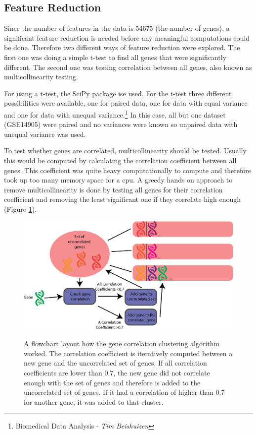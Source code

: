 \documentclass[10pt,a4paper]{article}
\begin{document}
	\subsection{Feature Reduction}
	\label{subsec:MethodsFeatureReduction}
	
	Since the number of features in the data is 54675 (the number of genes), a significant feature reduction is needed before any meaningful computations could be done. Therefore two different ways of feature reduction were explored. The first one was doing a simple t-test to find all genes that were significantly different. The second one was testing correlation between all genes, also known as multicollinearity testing.
	
	For using a t-test, the SciPy package ise used. For the t-test three different possibilities were available, one for paired data, one for data with equal variance and one for data with unequal variance.\footnote{\label{fn:BDA}Biomedical Data Analysis - \textit{Tim Beishuizen}} In this case, all but one dataset (GSE14905) were paired and no variances were known so unpaired data with unequal variance was used.
	
	To test whether genes are correlated, multicollinearity should be tested. Usually this would be computed by calculating the correlation coefficient between all genes. This coefficient was quite heavy computationally to compute and therefore took up too many memory space for a cpu. A greedy hands on approach to remove multicollinearity is done by testing all genes for their correlation coefficient and removing the least significant one if they correlate high enough (Figure \ref{fig:GreedyCorrelationClustering}).
	
	\begin{figure}
		\includegraphics[width=1\textwidth]{GreedyClustering.png}
		\label{fig:GreedyCorrelationClustering}
		\caption{A flowchart layout how the gene correlation clustering algorithm worked. The correlation coefficient is iteratively computed between a new gene and the uncorrelated set of genes. If all correlation coefficients are lower than $0.7$, the new gene did not correlate enough with the set of genes and therefore is added to the uncorrelated set of genes. If it had a correlation of higher than 0.7 for another gene, it was added to that cluster. }
	\end{figure}
	
\end{document}
